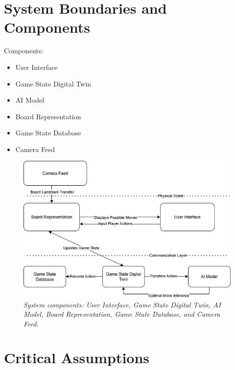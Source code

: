 \documentclass{article}
\begin{document}
\section{System Boundaries and Components}




Components: 
\begin{itemize}

\item User Interface
\item Game State Digital Twin
\item AI Model
\item Board Representation
\item Game State Database
\item Camera Feed

\end{itemize}

\begin{figure}[H]
    \centering
    \includegraphics[width=\textwidth]{Component_Diagram_hazards.png}
    \caption{\textit{System components: User Interface, Game State Digital Twin, AI Model, Board Representation, Game State Database, and Camera Feed.}}
    \label{fig:component-diagram}
\end{figure}

\section{Critical Assumptions}
\end{document}
